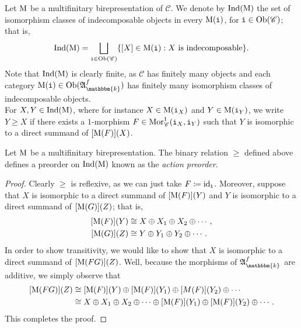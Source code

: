 \noindent Let $\textup{M}$ be a multifinitary birepresentation of $\mathscr{C}$. We denote by $\textup{Ind}(\textup{M})$ the set of isomorphism classes of indecomposable objects in every $\textup{M}(\textnormal{\texttt{i}})$, for $\textnormal{\texttt{i}} \in \textnormal{Ob}(\mathscr{C})$; that is,
\begin{align*}
\begin{split}
\textup{Ind}(\textup{M}) = \bigsqcup_{\textnormal{\texttt{i}} \in \textnormal{Ob}(\mathscr{C})} \{[X] \in \textup{M}(\textnormal{\texttt{i}}) : \textup{$X$ is indecomposable}\}.
\end{split}
\end{align*}
\noindent Note that $\textup{Ind}(\textup{M})$ is clearly finite, as $\mathscr{C}$ has finitely many objects and each category $\textup{M}(\textobj{i}) \in \obset(\mathfrak{A}_\mathbbm{k}^f)$ has finitely many isomorphism classes of indecomposable objects.\\

\noindent For $X, Y \in \textup{Ind}(\textup{M})$, where for instance $X \in \textup{M}(\textnormal{\texttt{i}}_X)$ and $Y \in \textup{M}(\textnormal{\texttt{i}}_Y)$, we write $Y \geq X$ if there exists a $1$-morphism $F \in \textnormal{Mor}_\mathscr{C}^1(\textnormal{\texttt{i}}_X, \textnormal{\texttt{i}}_Y)$ such that $Y$ is isomorphic to a direct summand of $[\textup{M}(F)](X)$.\\

\noindent\begin{lemma}\label{ActionPreorder} Let $\textup{M}$ be a multifinitary birepresentation. The binary relation $\geq$ defined above defines a preorder on $\textup{Ind}(\textup{M})$ known as the {\em action preorder}.\\
\end{lemma}

\noindent\begin{proof} Clearly $\geq$ is reflexive, as we can just take $F \coloneqq \textup{id}_{\textnormal{\texttt{i}}}$. Moreover, suppose that $X$ is isomorphic to a direct summand of $[\textup{M}(F)](Y)$ and $Y$ is isomorphic to a direct summand of $[\textup{M}(G)](Z)$; that is,
\begin{align*}
\begin{split}
[\textup{M}(F)](Y) &\cong X \oplus X_1 \oplus X_2 \oplus \cdots,\\
[\textup{M}(G)](Z) &\cong Y \oplus Y_1 \oplus Y_2 \oplus \cdots.
\end{split}
\end{align*}
\noindent In order to show transitivity, we would like to show that $X$ is isomorphic to a direct summand of $[\textup{M}(FG)](Z)$. Well, because the morphisms of $\mathfrak{A}_\mathbbm{k}^f$ are additive, we simply observe that
\begin{align*}
\begin{split}
[\textup{M}(FG)](Z) &\cong [\textup{M}(F)](Y) \oplus [\textup{M}(F)](Y_1) \oplus [M(F)](Y_2) \oplus \cdots\\
&\cong X \oplus X_1 \oplus X_2 \oplus \cdots \oplus [\textup{M}(F)](Y_1) \oplus [\textup{M}(F)](Y_2) \oplus \cdots.
\end{split}
\end{align*}
\noindent This completes the proof.
\end{proof}\\

